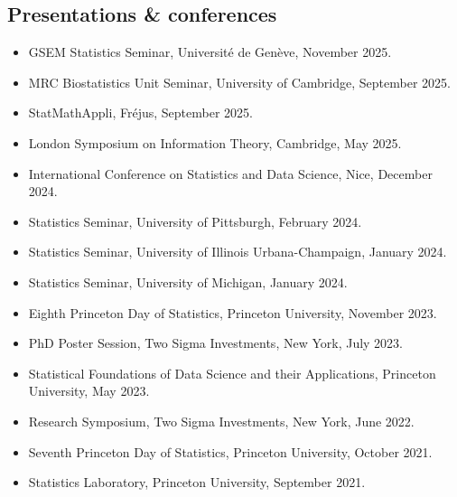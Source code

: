 \documentclass{wgu-cv}
\begin{document}
\subsection{Presentations \& conferences}{}
\begin{itemize}
  \item GSEM Statistics Seminar, Universit{\'e} de Gen{\`e}ve,
    November 2025.
  \item MRC Biostatistics Unit Seminar, University of Cambridge,
    September 2025.
  \item StatMathAppli, Fr{\'e}jus,
    September 2025.
  \item London Symposium on Information Theory, Cambridge,
    May 2025.
  \item International Conference on Statistics and Data Science, Nice,
    December 2024.
  \item Statistics Seminar, University of Pittsburgh,
    February 2024.
  \item Statistics Seminar, University of Illinois Urbana-Champaign,
    January 2024.
  \item Statistics Seminar, University of Michigan,
    January 2024.
  \item Eighth Princeton Day of Statistics, Princeton University,
    November 2023.
  \item PhD Poster Session, Two Sigma Investments, New York,
    July 2023.
  \item Statistical Foundations of Data Science and their Applications,
    Princeton University,
    May 2023.
  \item Research Symposium, Two Sigma Investments, New York,
    June 2022.
  \item Seventh Princeton Day of Statistics, Princeton University,
    October 2021.
  \item Statistics Laboratory, Princeton University,
    September 2021.
\end{itemize}
\end{document}
